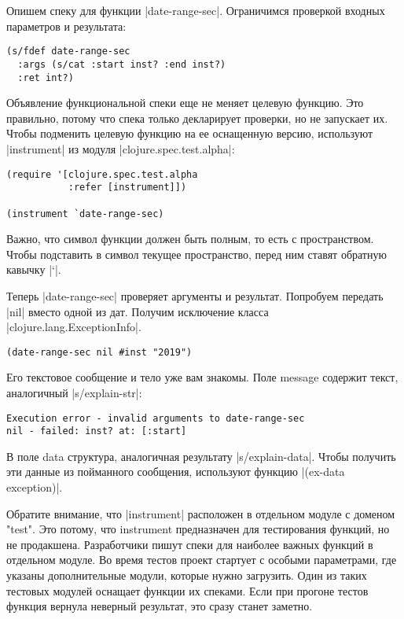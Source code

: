 Опишем спеку для функции \spverb|date-range-sec|. Ограничимся проверкой входных
параметров и результата:

\begin{verbatim}
(s/fdef date-range-sec
  :args (s/cat :start inst? :end inst?)
  :ret int?)
\end{verbatim}

Объявление функциональной спеки еще не меняет целевую функцию. Это правильно,
потому что спека только декларирует проверки, но не запускает их. Чтобы
подменить целевую функцию на ее оснащенную версию, используют \spverb|instrument| из
модуля \spverb|clojure.spec.test.alpha|:

\begin{verbatim}
(require '[clojure.spec.test.alpha
           :refer [instrument]])

(instrument `date-range-sec)
\end{verbatim}

Важно, что символ функции должен быть полным, то есть с пространством. Чтобы
подставить в символ текущее пространство, перед ним ставят обратную кавычку \spverb|`|.

Теперь \spverb|date-range-sec| проверяет аргументы и результат. Попробуем передать
\spverb|nil| вместо одной из дат. Получим исключение класса
\spverb|clojure.lang.ExceptionInfo|.

\begin{verbatim}
(date-range-sec nil #inst "2019")
\end{verbatim}

Его текстовое сообщение и тело уже вам знакомы. Поле message содержит текст,
аналогичный \spverb|s/explain-str|:

\begin{verbatim}
Execution error - invalid arguments to date-range-sec
nil - failed: inst? at: [:start]
\end{verbatim}

В поле data структура, аналогичная результату \spverb|s/explain-data|. Чтобы получить
эти данные из пойманного сообщения, используют функцию \spverb|(ex-data exception)|.

Обратите внимание, что \spverb|instrument| расположен в отдельном модуле с доменом
"test". Это потому, что instrument предназначен для тестирования функций, но не
продакшена. Разработчики пишут спеки для наиболее важных функций в отдельном
модуле. Во время тестов проект стартует с особыми параметрами, где указаны
дополнительные модули, которые нужно загрузить. Один из таких тестовых модулей
оснащает функции их спеками. Если при прогоне тестов функция вернула неверный
результат, это сразу станет заметно.

